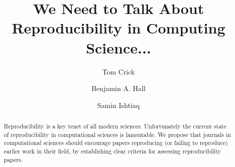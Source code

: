 \documentclass[a4paper,11pt]{article}
\begin{document}
\title{We Need to Talk About Reproducibility in Computing Science...}

\author[1]{Tom Crick}
\author[2]{Benjamin A. Hall}
\author[3]{Samin Ishtiaq}




\date{ }
\maketitle

\begin{abstract}
Reproducibility is a key tenet of all modern sciences.  Unfortunately
the current state of reproducibility in computational sciences is
lamentable.  We propose that journals in computational sciences should
encourage papers reproducing (or failing to reproduce) earlier work in
their field, by establishing clear criteria for assessing
reproducibility papers.
\end{abstract}


\end{document}
